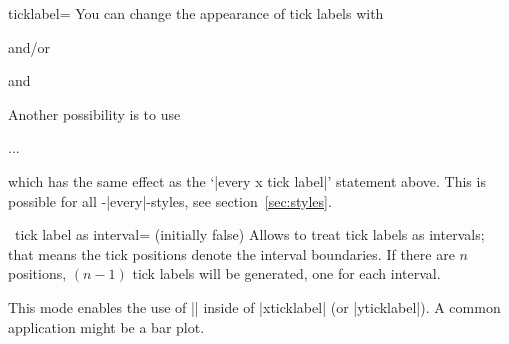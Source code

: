 \begin{pgfplotsxykey}{\x ticklabel=}
You can change the appearance of tick labels with
\begin{codeexample}
\end{codeexample}
and/or
\begin{codeexample}
\end{codeexample}
and
\begin{codeexample}
\end{codeexample}
Another possibility is to use 
\begin{codeexample}
\begin{axis}[y tick label style={above,
	/pgf/number format/fixed zerofill}
]
...
\end{axis}
\end{codeexample}
which has the same effect as the `|every x tick label|' statement above. This is possible for all \PGFPlots-|every|-styles, see section~\ref{sec:styles}.
\end{pgfplotsxykey}

\begin{pgfplotsxykey}{\x\ tick label as interval= (initially false)}
	Allows to treat tick labels as intervals; that means the tick positions denote the interval boundaries. If there are $n$ positions, $(n-1)$ tick labels will be generated, one for each interval.
\begin{codeexample}[]
\end{codeexample}
	This mode enables the use of |\nexttick| inside of |xticklabel| (or |yticklabel|). A common application might be a bar plot.
\begin{codeexample}[]
\end{codeexample}
\end{pgfplotsxykey}

